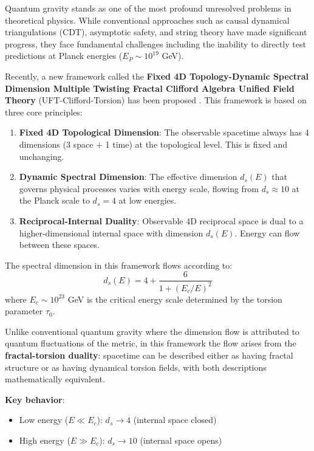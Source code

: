 \documentclass[12pt,a4paper]{article}
\begin{document}
Quantum gravity stands as one of the most profound unresolved problems in theoretical physics. While conventional approaches such as causal dynamical triangulations (CDT), asymptotic safety, and string theory have made significant progress, they face fundamental challenges including the inability to directly test predictions at Planck energies ($E_P \sim 10^{19}$ GeV).

Recently, a new framework called the \textbf{Fixed 4D Topology-Dynamic Spectral Dimension Multiple Twisting Fractal Clifford Algebra Unified Field Theory} (UFT-Clifford-Torsion) has been proposed \cite{wang2026}. This framework is based on three core principles:

\begin{enumerate}
    \item \textbf{Fixed 4D Topological Dimension}: The observable spacetime always has 4 dimensions (3 space + 1 time) at the topological level. This is fixed and unchanging.
    \item \textbf{Dynamic Spectral Dimension}: The effective dimension $d_s(E)$ that governs physical processes varies with energy scale, flowing from $d_s \approx 10$ at the Planck scale to $d_s = 4$ at low energies.
    \item \textbf{Reciprocal-Internal Duality}: Observable 4D reciprocal space is dual to a higher-dimensional internal space with dimension $d_s(E)$. Energy can flow between these spaces.
\end{enumerate}

The spectral dimension in this framework flows according to:
\begin{equation}
    d_s(E) = 4 + \frac{6}{1+(E_c/E)^2}
\end{equation}
where $E_c \sim 10^{23}$ GeV is the critical energy scale determined by the torsion parameter $\tau_0$.

Unlike conventional quantum gravity where the dimension flow is attributed to quantum fluctuations of the metric, in this framework the flow arises from the \textbf{fractal-torsion duality}: spacetime can be described either as having fractal structure or as having dynamical torsion fields, with both descriptions mathematically equivalent.

\textbf{Key behavior}:
\begin{itemize}
    \item Low energy ($E \ll E_c$): $d_s \to 4$ (internal space closed)
    \item High energy ($E \gg E_c$): $d_s \to 10$ (internal space opens)
\end{itemize}
\end{document}
